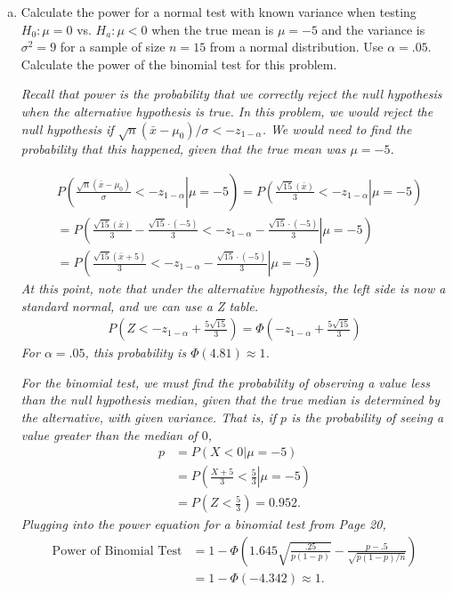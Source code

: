 \documentclass[12pt]{article}
\begin{document}
\begin{enumerate}[(a)]
\item Calculate the power for a normal test with known variance when testing $H_0: \mu = 0$ vs. $H_a: \mu < 0$ when the true mean is $\mu=-5$ and the variance is $\sigma^2 =9$ for a sample of size $n = 15$ from a normal distribution. Use $\alpha = .05$. Calculate the power of the binomial test for this problem.

\emph{Recall that power is the probability that we correctly reject the null hypothesis when the alternative hypothesis is true. In this problem, we would reject the null hypothesis if $\sqrt{n} (\bar{x} - \mu_0) / \sigma < -z_{1-\alpha}$. We would need to find the probability that this happened, given that the true mean was $\mu=-5$.}

\begin{align*}
&P \left. \left(\frac{\sqrt{n} (\bar{x} - \mu_0)}{\sigma} < -z_{1-\alpha} \right| \mu=-5 \right) 
= P\left. \left(\frac{\sqrt{15} (\bar{x})}{3} < -z_{1-\alpha} \right| \mu=-5 \right) \\
&= P \left. \left(\frac{\sqrt{15} (\bar{x})}{3} - \frac{\sqrt{15} \cdot (-5)}{3} < -z_{1-\alpha} - \frac{\sqrt{15} \cdot (-5)}{3} \right| \mu=-5 \right) \\
&= P \left. \left(\frac{\sqrt{15} (\bar{x} + 5)}{3} < -z_{1-\alpha} - \frac{\sqrt{15} \cdot (-5)}{3} \right| \mu=-5 \right)
\end{align*}
\emph{At this point, note that under the alternative hypothesis, the left side is now a standard normal, and we can use a Z table.}
\begin{align*}
P \left(Z < -z_{1-\alpha} + \frac{5 \sqrt{15}}{3} \right) = \Phi \left(-z_{1-\alpha} + \frac{5 \sqrt{15}}{3} \right)
\end{align*}
\emph{For $\alpha=.05$, this probability is $\Phi\left( 4.81 \right) \approx 1$.}

\emph{For the binomial test, we must find the probability of observing a value less than the null hypothesis median, given that the true median is determined by the alternative, with given variance. That is, if $p$ is the probability of seeing a value greater than the median of $0$,}
\begin{align*}
p &= P \left. \left( X < 0 \right| \mu=-5 \right) \\
& = P \left. \left( \frac{X+5}{3} < \frac{5}{3} \right| \mu=-5 \right) \\
& = P \left( Z < \frac{5}{3} \right) = 0.952.
\end{align*}
\emph{Plugging into the power equation for a binomial test from Page 20, }
\begin{align*}
\mbox{Power of Binomial Test} 
& = 1-\Phi \left( 1.645 \sqrt{\frac{.25}{p(1-p)}} - \frac{p-.5}{\sqrt{p(1-p)/n}} \right)\\
& = 1-\Phi \left( -4.342 \right) \approx 1.
\end{align*}


\end{enumerate}
\end{document}

